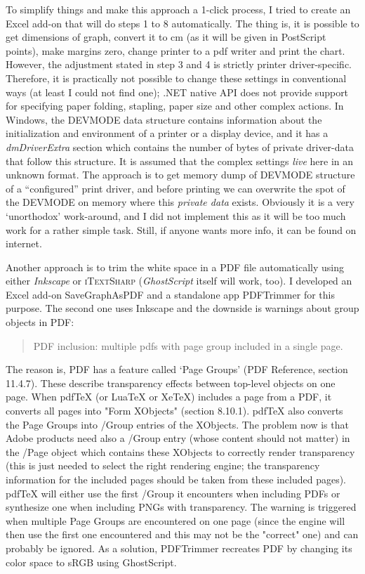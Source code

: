 \documentclass[10pt, a4paper]{article}
\begin{document}
To simplify things and make this approach a 1-click process, I tried to create an Excel add-on that will do steps 1 to 8 automatically. The thing is, it is possible to get dimensions of graph, convert it to cm (as it will be given in PostScript points), make margins zero, change printer to a pdf writer and print the chart. However, the adjustment stated in step 3 and 4 is strictly printer driver-specific. Therefore, it is practically not possible to change these settings in conventional ways (at least I could not find one); .NET native API does not provide support for specifying paper folding, stapling, paper size and other complex actions. In Windows, the DEVMODE data structure contains information about the initialization and environment of a printer or a display device, and it has a \emph{dmDriverExtra} section which contains the number of bytes of private driver-data that follow this structure. It is assumed that the complex settings \textit{live} here in an unknown format. The approach is to get memory dump of DEVMODE structure of a ``configured'' print driver, and before printing we can overwrite the spot of the DEVMODE on memory where this \emph{private data} exists. Obviously it is a very `unorthodox' work-around, and I did not implement this as it will be too much work for a rather simple task. Still, if anyone wants more info, it can be found on internet. 

Another approach is to trim the white space in a PDF file automatically using either \textsl{Inkscape} or \textsc{iTextSharp} (\textsl{GhostScript} itself will work, too). I developed an Excel add-on SaveGraphAsPDF and a standalone app PDFTrimmer for this purpose. 
The second one uses Inkscape and the downside is warnings about group objects in PDF:
\begin{quote}
	PDF inclusion: multiple pdfs with page group included in a single page.
\end{quote}
The reason is, PDF has a feature called `Page Groups' (PDF Reference, section 11.4.7). These describe transparency effects between top-level objects on one page. When pdfTeX (or LuaTeX or XeTeX) includes a page from a PDF, it converts all pages into "Form XObjects" (section 8.10.1). pdfTeX also converts the Page Groups into /Group entries of the XObjects.
The problem now is that Adobe products need also a /Group entry (whose content should not matter) in the /Page object which contains these XObjects to correctly render transparency (this is just needed to select the right rendering engine; the transparency information for the included pages should be taken from these included pages).
pdfTeX will either use the first /Group it encounters when including PDFs or synthesize one when including PNGs with transparency. The warning is triggered when multiple Page Groups are encountered on one page (since the engine will then use the first one encountered and this may not be the "correct" one) and can probably be ignored. As a solution, PDFTrimmer recreates PDF by changing its color space to sRGB using GhostScript. 
\end{document}
